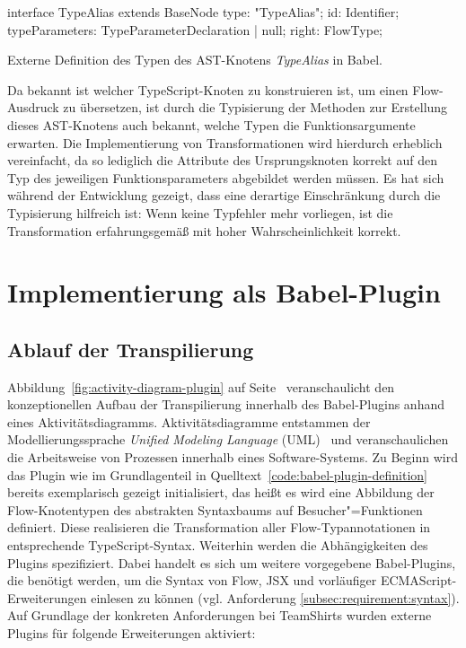 {\bigbreak
\begin{listing}[htb]
\begin{textcode}
interface TypeAlias extends BaseNode {
  type: "TypeAlias";
  id: Identifier;
  typeParameters: TypeParameterDeclaration | null;
  right: FlowType;
}
\end{textcode}
\listingvspace
\caption{Externe Definition des Typen des AST-Knotens \textit{TypeAlias} in Babel.}
\label{code:babel:static-types}
\end{listing}

Da bekannt ist welcher TypeScript-Knoten zu konstruieren ist, um einen Flow-Ausdruck zu übersetzen, ist durch die Typisierung der Methoden zur Erstellung dieses AST-Knotens auch bekannt, welche Typen die Funktionsargumente erwarten. Die Implementierung von Transformationen wird hierdurch erheblich vereinfacht, da so lediglich die Attribute des Ursprungsknoten korrekt auf den Typ des jeweiligen Funktionsparameters abgebildet werden müssen. Es hat sich während der Entwicklung gezeigt, dass eine derartige Einschränkung durch die Typisierung hilfreich ist: Wenn keine Typfehler mehr vorliegen, ist die Transformation erfahrungsgemäß mit hoher Wahrscheinlichkeit korrekt.

\section{Implementierung als Babel-Plugin}

\subsection{Ablauf der Transpilierung}

Abbildung~\ref{fig:activity-diagram-plugin} auf Seite~\pageref{fig:activity-diagram-plugin} veranschaulicht den konzeptionellen Aufbau der Transpilierung innerhalb des Babel-Plugins anhand eines Aktivitätsdiagramms. Aktivitätsdiagramme entstammen der Modellierungssprache \textit{Unified Modeling Language} (UML)~\autocite{OMG:UML} und veranschaulichen die Arbeitsweise von Prozessen innerhalb eines Software-Systems. Zu Beginn wird das Plugin wie im Grundlagenteil in Quelltext~\ref{code:babel-plugin-definition} bereits exemplarisch gezeigt initialisiert, das heißt es wird eine Abbildung der Flow-Knotentypen des abstrakten Syntaxbaums auf Besucher"=Funktionen definiert. Diese realisieren die Transformation aller Flow-Typannotationen in entsprechende TypeScript-Syntax.
Weiterhin werden die Abhängigkeiten des Plugins spezifiziert. Dabei handelt es sich um weitere vorgegebene Babel-Plugins, die benötigt werden, um die Syntax von Flow, JSX und vorläufiger ECMAScript-Erweiterungen einlesen zu können (vgl. Anforderung \ref{subsec:requirement:syntax}). Auf Grundlage der konkreten Anforderungen bei TeamShirts wurden externe Plugins für folgende Erweiterungen aktiviert:

}
